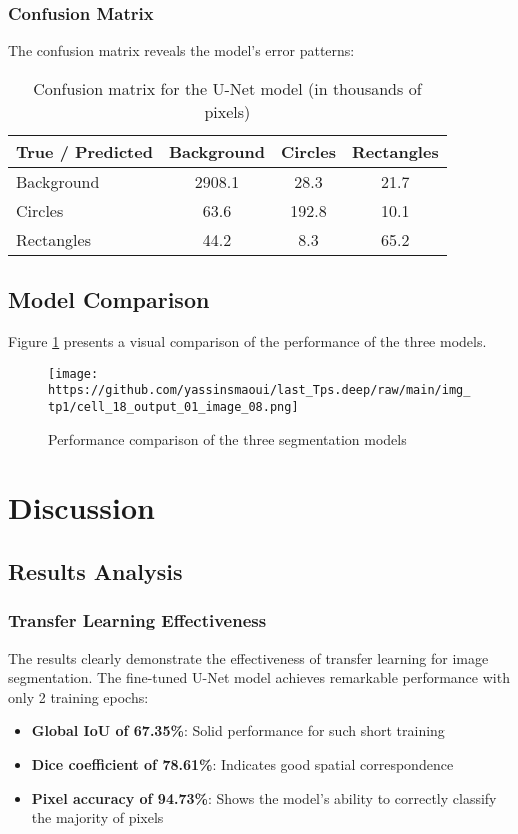 \documentclass[12pt,a4paper]{article}
\begin{document}
\subsubsection{Confusion Matrix}

The confusion matrix reveals the model's error patterns:

\begin{table}[H]
\centering
\caption{Confusion matrix for the U-Net model (in thousands of pixels)}
\label{tab:confusion_matrix}
\begin{tabular}{@{}l|ccc@{}}
\toprule
\textbf{True / Predicted} & \textbf{Background} & \textbf{Circles} & \textbf{Rectangles} \\
\midrule
Background & 2908.1 & 28.3 & 21.7 \\
Circles & 63.6 & 192.8 & 10.1 \\
Rectangles & 44.2 & 8.3 & 65.2 \\
\bottomrule
\end{tabular}
\end{table}

\subsection{Model Comparison}

Figure \ref{fig:model_comparison_chart} presents a visual comparison of the performance of the three models.

\begin{figure}[H]
    \centering
    \texttt{[image: https://github.com/yassinsmaoui/last\_Tps.deep/raw/main/img\_tp1/cell\_18\_output\_01\_image\_08.png]}
    \caption{Performance comparison of the three segmentation models}
    \label{fig:model_comparison_chart}
\end{figure}

\section{Discussion}

\subsection{Results Analysis}

\subsubsection{Transfer Learning Effectiveness}

The results clearly demonstrate the effectiveness of transfer learning for image segmentation. The fine-tuned U-Net model achieves remarkable performance with only 2 training epochs:
\begin{itemize}
    \item \textbf{Global IoU of 67.35\%}: Solid performance for such short training
    \item \textbf{Dice coefficient of 78.61\%}: Indicates good spatial correspondence
    \item \textbf{Pixel accuracy of 94.73\%}: Shows the model's ability to correctly classify the majority of pixels
\end{itemize}
\end{document}
